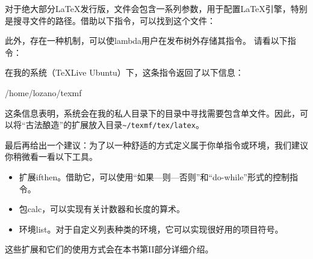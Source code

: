 对于绝大部分\LaTeX 发行版，文件会包含一系列参数，用于配置\LaTeX 引擎，特别是搜寻文件的路径。借助以下指令，可以找到这个文件：


此外，存在一种机制，可以使lambda用户在发布树外存储其指令。%
请看以下指令：


在我的系统（\TeX Live Ubuntu）下，这条指令返回了以下信息：

\begin{dmd}
/home/lozano/texmf
\end{dmd}

这条信息表明，系统会在我的私人目录下的目录中寻找需要包含单文件。因此，可以将``古法酿造''的扩展放入目录\verb+~/texmf/tex/latex+。

最后再给出一个建议：为了以一种舒适的方式定义属于你单指令或环境，我们建议你稍微看一看以下工具。

\begin{itemize}
  \item 扩展\textsf{ifthen}。借助它，可以使用``如果—则—否则''和``do-while''形式的控制指令。
  \item 包\textsf{calc}，可以实现有关计数器和长度的算术。
  \item 环境\textsf{list}。对于自定义列表种类的环境，它可以实现很好用的项目符号。
\end{itemize}

这些扩展和它们的使用方式会在本书第II部分详细介绍。%